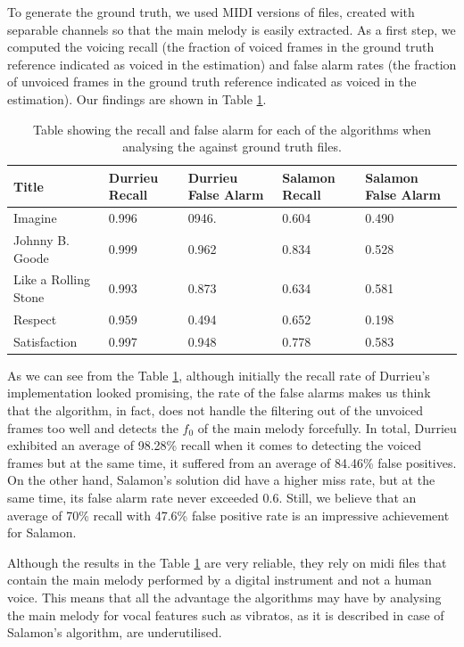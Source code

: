 To generate the ground truth, we used MIDI versions of files, created with separable channels so that the main melody is easily extracted. As a first step, we computed the voicing recall (the fraction of voiced frames in the ground truth reference indicated as voiced in the estimation) and false alarm rates (the fraction of unvoiced frames in the ground truth reference indicated as voiced in the estimation).
Our findings are shown in Table \ref{table:voicedunvoiced}.

\begin{table}
\begin{center}
\begin{tabular} {| p{5cm}| p{1.75cm} | p{1.75cm} | p{1.75cm} | p{1.75cm} |} \hline
Title 	& Durrieu Recall & Durrieu False Alarm 	& Salamon Recall 	& Salamon False Alarm \\ \hline \hline
Imagine						& 0.996		& 0946.		& 0.604			& 0.490		\\	\hline
Johnny B. Goode		& 0.999		& 0.962		& 0.834			& 0.528		\\ 	\hline
Like a Rolling Stone	& 0.993		& 0.873		& 0.634			& 0.581		\\ 	\hline
Respect						& 0.959		& 0.494		& 0.652			& 0.198		\\ 	\hline
Satisfaction				& 0.997		& 0.948		& 0.778			& 0.583		\\	\hline
\end{tabular}
\caption{Table showing the recall and false alarm for each of the algorithms when analysing the against ground truth files.}
\label{table:voicedunvoiced}
\end{center}
\end{table}

As we can see from the Table \ref{table:voicedunvoiced}, although initially the recall rate of Durrieu's implementation looked promising, the rate of the false alarms makes us think that the algorithm, in fact, does not handle the filtering out of the unvoiced frames too well and detects the $f_{0}$ of the main melody forcefully. In total, Durrieu exhibited an average of 98.28\% recall when it comes to detecting the voiced frames but at the same time, it suffered from an average of 84.46\% false positives. On the other hand, Salamon's solution did have a higher miss rate, but at the same time, its false alarm rate never exceeded 0.6. Still, we believe that an average of 70\% recall with 47.6\% false positive rate is an impressive achievement for Salamon.

Although the results in the Table \ref{table:voicedunvoiced} are very reliable, they rely on midi files that contain the main melody performed by a digital instrument and not a human voice. This means that all the advantage the algorithms may have by analysing the main melody for vocal features such as vibratos, as it is described in case of Salamon's algorithm, are underutilised. 

